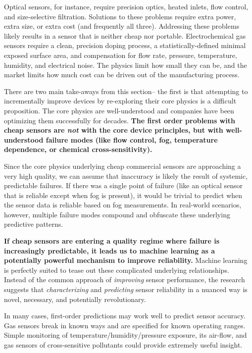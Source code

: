 Optical sensors, for instance, require precision optics, heated inlets, flow control, and size-selective filtration.  Solutions to these problems require extra power, extra size, or extra cost (and frequently all three).  Addressing these problems likely results in a sensor that is neither cheap nor portable.  Electrochemical gas sensors require a clean, precision doping process, a statistically-defined minimal exposed surface area, and compensation for flow rate, pressure, temperature, humidity, and electrical noise.  The physics limit how small they can be, and the market limits how much cost can be driven out of the manufacturing process.

There are two main take-aways from this section-- the first is that attempting to incrementally improve devices by re-exploring their core physics is a difficult proposition.  The core physics are well-understood and companies have been optimizing them successfully for decades.  \textbf{The first order problems with cheap sensors are \textit{not} with the core device principles, but with well-understood failure modes (like flow control, fog, temperature dependence, or chemical cross-sensitivity).}

Since the core physics underlying cheap commercial sensors are approaching a very high quality,  we can assume that inaccuracy is likely the result of systemic, predictable failures.  If there was a single point of failure (like an optical sensor that is reliable except when fog is present), it would be trivial to predict when the sensor data is reliable based on fog measurements.  In real-world scenarios, however, multiple failure modes compound and obfuscate these underlying predictive patterns.

\textbf{If cheap sensors are entering a quality regime where failure is increasingly predictable, it leads us to machine learning as a potentially powerful mechanism to improve reliability.}  Machine learning is perfectly suited to tease out these complicated underlying relationships.  Instead of the common approach of \textit{improving} sensor performance, the research suggests that \textit{characterizing} and \textit{predicting} sensor reliability in a nuanced way is novel, necessary, and potentially revolutionary.

In many cases, first-order predictions may work well to predict sensor accuracy.  Gas sensors break in known ways and are specified for known operating ranges.  Simple monitoring of temperature/humidity/pressure exposure, its air-flow, and gas sensors of cross-sensitive pollutants could provide extremely useful insight.  

